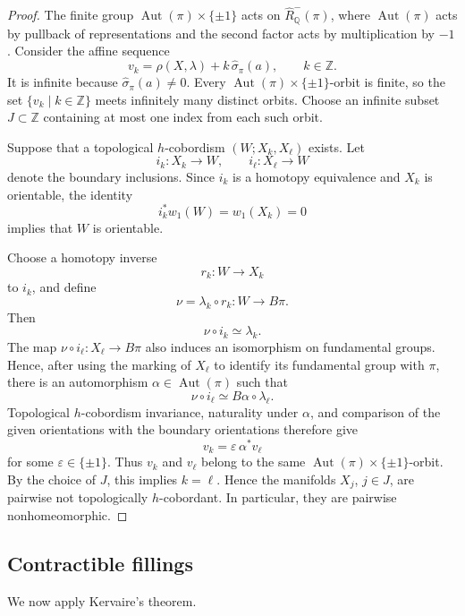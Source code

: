 \documentclass[10pt,reqno]{amsart}
\numberwithin{equation}{section}
\theoremstyle{definition}
\theoremstyle{remark}
\newcommand{\Z}{\mathbb Z}
\newcommand{\Q}{\mathbb Q}
\newcommand{\Aut}{\operatorname{Aut}}
\begin{document}
\begin{proof}
The finite group \(\Aut(\pi)\times\{\pm1\}\) acts on
\(\widehat R^-_{\Q}(\pi)\), where \(\Aut(\pi)\) acts by pullback of
representations and the second factor acts by multiplication by
\(-1\).  Consider the affine sequence
\[
v_k
=
\rho(X,\lambda)+k\,\widehat\sigma_\pi(a),
\qquad k\in\Z.
\]
It is infinite because \(\widehat\sigma_\pi(a)\neq0\).  Every
\(\Aut(\pi)\times\{\pm1\}\)-orbit is finite, so the set
\(\{v_k\mid k\in\Z\}\) meets infinitely many distinct orbits.  Choose
an infinite subset \(J\subset\Z\) containing at most one index from
each such orbit.



Suppose that a topological \(h\)-cobordism $(W;X_k,X_\ell)$ exists. Let
\[
i_k\colon X_k\longrightarrow W,
\qquad
i_\ell\colon X_\ell\longrightarrow W
\]
denote the boundary inclusions. Since \(i_k\) is a homotopy
equivalence and \(X_k\) is orientable, the identity
\[
i_k^*w_1(W)=w_1(X_k)=0
\]
implies that \(W\) is orientable.

Choose a homotopy inverse
\[
r_k\colon W\longrightarrow X_k
\]
to \(i_k\), and define
\[
\nu=\lambda_k\circ r_k\colon W\longrightarrow B\pi.
\]
Then
\[
\nu\circ i_k\simeq\lambda_k.
\]
The map \(\nu\circ i_\ell\colon X_\ell\to B\pi\) also induces an
isomorphism on fundamental groups.  Hence, after using the marking
of \(X_\ell\) to identify its fundamental group with \(\pi\), there
is an automorphism \(\alpha\in\Aut(\pi)\) such that
\[
\nu\circ i_\ell\simeq B\alpha\circ\lambda_\ell.
\]
Topological \(h\)-cobordism invariance, naturality under \(\alpha\),
and comparison of the given orientations with the boundary
orientations therefore give
\[
v_k=\varepsilon\,\alpha^*v_\ell
\]
for some \(\varepsilon\in\{\pm1\}\).
Thus \(v_k\) and \(v_\ell\) belong to the same
\(\operatorname{Aut}(\pi)\times\{\pm1\}\)-orbit. By the choice of \(J\),
this implies \(k=\ell\). Hence the manifolds \(X_j\), \(j\in J\), are
pairwise not topologically \(h\)-cobordant. In particular, they are
pairwise nonhomeomorphic.
\end{proof}

\subsection{Contractible fillings}

We now apply Kervaire's theorem.
\end{document}
